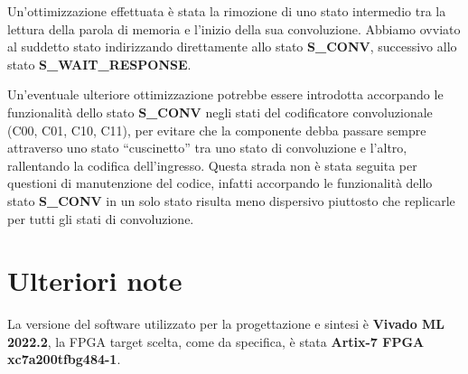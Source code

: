 Un’ottimizzazione effettuata è stata la rimozione di uno stato intermedio tra la lettura della parola di memoria e l’inizio della sua convoluzione. Abbiamo ovviato al suddetto stato indirizzando direttamente allo stato \textbf{S\_CONV}, successivo allo stato \textbf{S\_WAIT\_RESPONSE}. 

Un’eventuale ulteriore ottimizzazione potrebbe essere introdotta accorpando le funzionalità dello stato \textbf{S\_CONV} negli stati del codificatore convoluzionale (C00, C01, C10, C11), per evitare che la componente debba passare sempre attraverso uno stato “cuscinetto” tra uno stato di convoluzione e l’altro, rallentando la codifica dell’ingresso. Questa strada non è stata seguita per questioni di manutenzione del codice, infatti accorpando le funzionalità dello stato \textbf{S\_CONV} in un solo stato risulta meno dispersivo piuttosto che replicarle per tutti gli stati di convoluzione.

\section{Ulteriori note}
La versione del software utilizzato per la progettazione e sintesi è \textbf{Vivado ML 2022.2}, la FPGA target scelta, come da specifica, è stata \textbf{Artix-7 FPGA xc7a200tfbg484-1}.